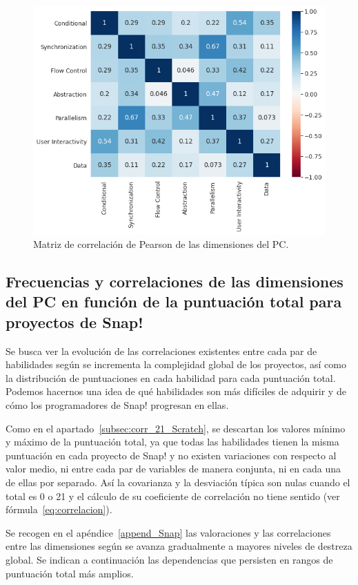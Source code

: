 \documentclass[a4paper, 12pt]{book}
\begin{document}
\begin{figure}[H]
    \centering
    \includegraphics[width=.7\textwidth]{img/corr_Snap.png}
    \caption{Matriz de correlación de Pearson de las dimensiones del PC.}\label{fig:corr_Snap}
\end{figure}

\subsection{Frecuencias y correlaciones de las dimensiones del PC en función de la puntuación total para proyectos de Snap!}
\label{subsec:corr_21_Snap}

Se busca ver la evolución de las correlaciones existentes entre cada par de habilidades según se incrementa la complejidad global de los proyectos, así como la distribución de puntuaciones en cada habilidad para cada puntuación total. Podemos hacernos una idea de qué habilidades son más difíciles de adquirir y de cómo los programadores de Snap! progresan en ellas.

Como en el apartado~\ref{subsec:corr_21_Scratch}, se descartan los valores mínimo y máximo de la puntuación total, ya que todas las habilidades tienen la misma puntuación en cada proyecto de Snap! y no existen variaciones con respecto al valor medio, ni entre cada par de variables de manera conjunta, ni en cada una de ellas por separado. Así la covarianza y la desviación típica son nulas cuando el total es 0 o 21 y el cálculo de su coeficiente de correlación no tiene sentido (ver fórmula~\eqref{eq:correlacion}). 

Se recogen en el apéndice~\ref{append_Snap} las valoraciones y las correlaciones entre las dimensiones según se avanza gradualmente a mayores niveles de destreza global. Se indican a continuación las dependencias que persisten en rangos de puntuación total más amplios.
\end{document}
